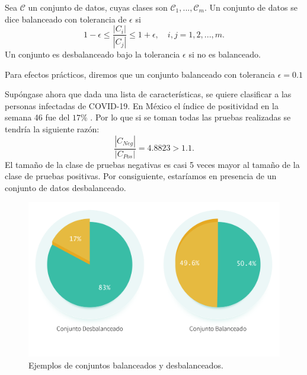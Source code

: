     \begin{definition}
    \label{balanced}
        Sea $\mathcal C$ un conjunto de datos, cuyas clases son $\mathcal C_1, ..., \mathcal C_m$. Un conjunto de datos se dice balanceado con tolerancia de $\epsilon$ si 
        \begin{equation}
            1-\epsilon \leq \frac{|C_i|}{|C_j|} \leq 1 + \epsilon, \quad i,j = 1,2, ..., m.
        \end{equation}
        Un conjunto es desbalanceado bajo la tolerancia $\epsilon$ si no es balanceado.
    \end{definition}
    Para efectos prácticos, diremos que un conjunto balanceado con tolerancia $\epsilon = 0.1$
    \begin{example}
        Supóngase ahora que dada una lista de características, se quiere clasificar a las personas infectadas de COVID-19. En México el índice de positividad en la semana 46 fue del $17\%$ \cite{grafica}. Por lo que si se toman todas las pruebas realizadas se tendría la siguiente razón:
        \begin{equation}
            \frac{|C_{Neg}|}{|C_{Pos}|} = 4.8823 > 1.1.
        \end{equation}
        El tamaño de la clase de pruebas negativas es casi 5 veces mayor al tamaño de la clase de pruebas positivas. Por consiguiente, estaríamos en presencia de un conjunto de datos desbalanceado.
    \end{example}
    \begin{figure}[H]
        \centering
        \includegraphics[width=6in]{../cap1_preliminares/src/unbalanced.png}
        \caption{Ejemplos de conjuntos balanceados y desbalanceados.}
    \end{figure}
